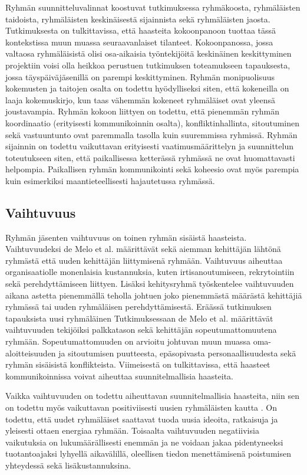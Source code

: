 Ryhmän suunnitteluvalinnat koostuvat tutkimuksessa \cite{DEOMELO2013412} ryhmäkoosta, ryhmäläisten taidoista, ryhmäläisten keskinäisestä sijainnista sekä ryhmäläisten jaosta. Tutkimuksesta on tulkittavissa, että haasteita kokoonpanoon tuottaa tässä kontekstissa muun muassa seuraavanlaiset tilanteet. Kokoonpanossa, jossa valtaosa ryhmäläisistä olisi osa-aikaisia työntekijöitä keskinäinen keskittyminen projektiin voisi olla heikkoa perustuen tutkimuksen toteamukseen tapauksesta, jossa täyspäiväjäsenillä on parempi keskittyminen. Ryhmän monipuolisuus kokemusten ja taitojen osalta on todettu hyödylliseksi siten, että kokeneilla on laaja kokemuskirjo, kun taas vähemmän kokeneet ryhmäläiset ovat yleensä joustavampia. Ryhmän kokoon liittyen on todettu, että pienemmän ryhmän koordinaatio (erityisesti kommunikoinnin osalta), konfliktinhallinta, sitoutuminen sekä vastuuntunto ovat paremmalla tasolla kuin suuremmissa ryhmissä. Ryhmän sijainnin on todettu vaikuttavan erityisesti vaatimusmäärittelyn ja suunnittelun toteutukseen siten, että paikallisessa ketterässä ryhmässä ne ovat huomattavasti helpompia. Paikallisen ryhmän kommunikointi sekä koheesio ovat myös parempia kuin esimerkiksi maantieteellisesti hajautetussa ryhmässä.

\subsection{Vaihtuvuus}

Ryhmän jäsenten vaihtuvuus on toinen ryhmän sisäistä haasteista. Vaihtuvuudeksi de Melo et al. \cite{DEOMELO2013412} määrittävät sekä aiemman kehittäjän lähtönä ryhmästä että uuden kehittäjän liittymisenä ryhmään. Vaihtuvuus aiheuttaa organisaatiolle monenlaisia kustannuksia, kuten irtisanoutumiseen, rekrytointiin sekä perehdyttämiseen liittyen. Lisäksi kehitysryhmä työskentelee vaihtuvuuden aikana astetta pienemmällä teholla johtuen joko pienemmästä määrästä kehittäjiä ryhmässä tai uuden ryhmäläisen perehdyttämisestä. Eräässä tutkimuksen tapauksista uusi ryhmäläinen  Tutkimuksessaan de Melo et al. määrittävät vaihtuvuuden tekijöiksi palkkatason sekä kehittäjän sopeutumattomuutena ryhmään. Sopeutumattomuuden on arvioitu johtuvan muun muassa oma-aloitteisuuden ja sitoutumisen puutteesta, epäsopivasta personaallisuudesta sekä ryhmän sisäisistä konflikteista. Viimeisestä on tulkittavissa, että haasteet kommunikoinnissa voivat aiheuttaa suunnitelmallisia haasteita. 

Vaikka vaihtuvuuden on todettu aiheuttavan suunnitelmallisia haasteita, niin sen on todettu myös vaikuttavan positiviisesti uusien ryhmäläisten kautta \cite{DEOMELO2013412}. On todettu, että uudet ryhmäläiset saattavat tuoda uusia ideoita, ratkaisuja ja yleisesti ottaen energiaa ryhmään. Toisaalta vaihtuvuuden negatiivisia vaikutuksia on lukumäärällisesti enemmän ja ne voidaan jakaa pidentyneeksi tuotantoajaksi lyhyellä aikavälillä, oleellisen tiedon menettämisenä poistumisen yhteydessä sekä lisäkustannuksina. 
